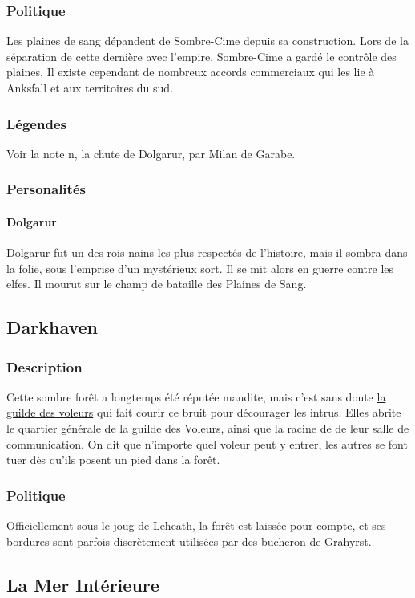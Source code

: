\subsubsection{Politique}
Les plaines de sang dépandent de Sombre-Cime depuis sa construction. Lors de la séparation de cette dernière avec l'empire, Sombre-Cime a gardé le contrôle des plaines. Il existe cependant de nombreux accords commerciaux qui les lie à Anksfall et aux territoires du sud.
\subsubsection{Légendes}
Voir la note n, la chute de Dolgarur, par Milan de Garabe.
\subsubsection{Personalités}
\paragraph{Dolgarur}
\hypertarget {dolgarur}{}Dolgarur fut un des rois nains les plus respectés de l'histoire, mais il sombra dans la folie, sous l'emprise d'un mystérieux sort. 
Il se mit alors en guerre contre les elfes. 
Il mourut sur le champ de bataille des Plaines de Sang.
\subsection{Darkhaven}
\subsubsection{Description}
\hypertarget{darkhaven}{}Cette sombre forêt a longtemps été réputée maudite,
mais c'est sans doute \hyperlink{laguildedesvoleurs}{la guilde des voleurs} qui fait courir ce bruit pour décourager les intrus.
Elles abrite le quartier générale de la guilde des Voleurs, ainsi que la racine de de leur salle de communication. 
On dit que n'importe quel voleur peut y entrer, les autres se font tuer dès qu'ils posent un pied dans la forêt.
\subsubsection{Politique}
Officiellement sous le joug de Leheath, la forêt est laissée pour compte, et ses bordures sont parfois discrètement utilisées par des bucheron de Grahyrst.
\subsection{La Mer Intérieure}
